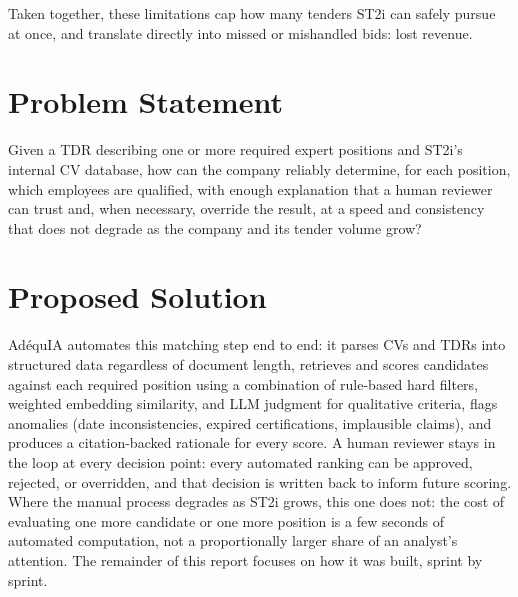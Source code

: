 Taken together, these limitations cap how many tenders ST2i can safely
pursue at once, and translate directly into missed or mishandled bids: lost
revenue.

\section{Problem Statement}

Given a TDR describing one or more required expert positions and ST2i's
internal CV database, how can the company reliably determine, for each
position, which employees are qualified, with enough explanation that a
human reviewer can trust and, when necessary, override the result, at a
speed and consistency that does not degrade as the company and its tender
volume grow?

\section{Proposed Solution}

AdéquIA automates this matching step end to end: it parses CVs and TDRs
into structured data regardless of document length, retrieves and scores
candidates against each required position using a combination of
rule-based hard filters, weighted embedding similarity, and LLM judgment
for qualitative criteria, flags anomalies (date inconsistencies, expired
certifications, implausible claims), and produces a citation-backed
rationale for every score. A human reviewer stays in the loop at every
decision point: every automated ranking can be approved, rejected, or
overridden, and that decision is written back to inform future scoring.
Where the manual process degrades as ST2i grows, this one does not: the
cost of evaluating one more candidate or one more position is a few
seconds of automated computation, not a proportionally larger share of an
analyst's attention. The remainder of this report focuses on how it was
built, sprint by sprint.
